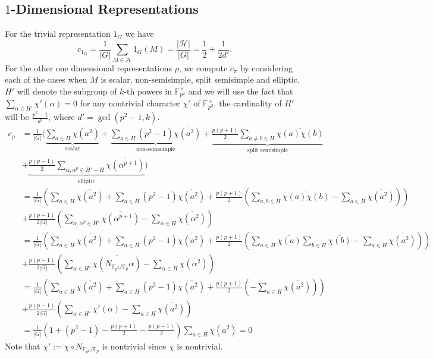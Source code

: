 \documentclass[12pt,reqno]{amsart}
\theoremstyle{plain}
\theoremstyle{definition}
\newcommand{\sH}{{\mathcal H}}
\theoremstyle{remark}
\newcommand{\FF}{\mathbb{F}}
\begin{document}
\subsection{$1$-Dimensional Representations} For the trivial representation $1_G$ we have $$c_{1_G}= \frac{1}{|G|} \sum\limits_{M \in \sH} 1_G(M)= \frac{|\sH|}{|G|}=\frac{1}{2}+\frac{1}{2d'}.$$
For the other one dimensional representations $\rho$, we compute $c_{\pi}$ by considering each of the cases when $M$ is  scalar, non-semisimple, split semisimple and elliptic. $H'$ will denote the subgroup of $k$-th powers in $\FF_{p^2}^{\times}$ and we will use the fact that $\sum_{\alpha \in H'}\overline{\chi'(\alpha)}=0$ for any nontrivial character $\chi'$ of $\FF_{p^2}^{\times}.$ the cardinality of $H'$ will be $\frac{p^2-1}{d'}$, where $d' = \gcd ( p^2-1,k).$
\begin{align*}
   c_{\rho} &= \frac{1}{|G|}(\underbrace{\sum_{a \in H} \overline{\chi(a^2)}}_{\text{scalar}} + \underbrace{\sum_{a \in H} (p^2-1) \overline{\chi(a^2)}}_{\text{non-semisimple}}+ \underbrace{\frac{p(p+1)}{2}\sum_{a\neq b \in H} \overline{\chi(a) \chi(b)}}_{\text{split semisimple}}\\&+ \underbrace{\frac{p(p-1)}{2} \sum_{\alpha, \alpha^p \in H'-H}\overline{\chi(\alpha^{p+1})}}_{\text{elliptic}})\\ 
   &= \frac{1}{|G|}\left(\sum_{a \in H} \overline{\chi(a^2)}+ \sum_{a \in H} (p^2-1) \overline{\chi(a^2)}+ \frac{p(p+1)}{2}\left(\sum_{a, b \in H} \overline{\chi(a) \chi(b)} -\sum_{a \in H} \overline{\chi(a^2)}\right)\right)\\ 
   &+ \frac{p(p-1)}{2|G|}\left(\sum_{\alpha, \alpha^p \in H'}\overline{\chi(\alpha^{p+1})} -\sum_{\alpha\in H}\overline{\chi(\alpha^2)}\right)  \\
   &= \frac{1}{|G|}\left(\sum_{a \in H} \overline{\chi(a^2)}+ \sum_{a \in H} (p^2-1) \overline{\chi(a^2)}+ \frac{p(p+1)}{2}\left(\sum_{a\in H} \overline{\chi(a)}\sum_{b\in H} \overline{\chi(b)} -\sum_{a \in H} \overline{\chi(a^2)}\right)\right)\\
   &+ \frac{p(p-1)}{2|G|}\left(\sum_{\alpha  \in H'}\overline{\chi(N_{\FF_{p^2}/ \FF_p}\alpha)} -\sum_{\alpha\in H}\overline{\chi(\alpha^2)}\right) \\
   & = \frac{1}{|G|}\left(\sum_{a \in H} \overline{\chi(a^2)}+ \sum_{a \in H} (p^2-1) \overline{\chi(a^2)}+ \frac{p(p+1)}{2} \left( -\sum_{a \in H} \overline{\chi(a^2)}\right)\right)\\
   &+ \frac{p(p-1)}{2|G|}\left(\sum_{\alpha \in H'}\overline{\chi'(\alpha)} -\sum_{a\in H}\overline{\chi(a^2)}\right) \\
   &=\frac{1}{|G|}\left(1+(p^2-1)- \frac{p(p+1)}{2}-\frac{p(p-1)}{2}\right)\sum_{a \in H} \overline{\chi(a^2)} = 0 
\end{align*}
 Note that $\chi':= \chi \circ N_{\FF_{p^2}/ \FF_p}$ is nontrivial since $\chi$ is nontrivial.
\end{document}
